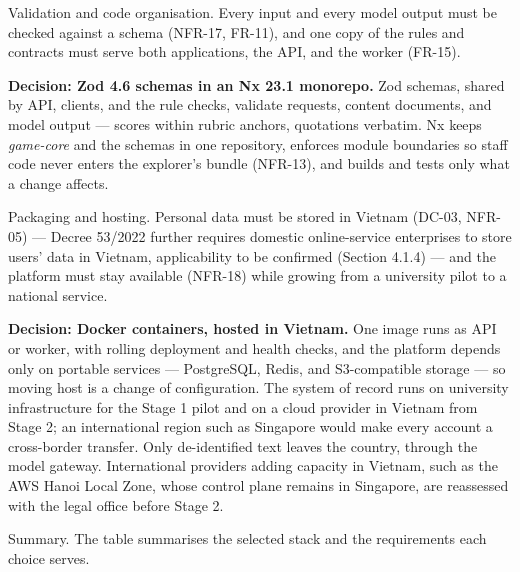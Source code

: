 Validation and code organisation. Every input and every model output must be checked against a schema (NFR-17, FR-11), and one copy of the rules and contracts must serve both applications, the API, and the worker (FR-15).

\textbf{Decision: Zod 4.6 schemas in an Nx 23.1 monorepo.} Zod schemas, shared by API, clients, and the rule checks, validate requests, content documents, and model output --- scores within rubric anchors, quotations verbatim. Nx keeps \textit{game-core} and the schemas in one repository, enforces module boundaries so staff code never enters the explorer's bundle (NFR-13), and builds and tests only what a change affects\cite{r160}.

Packaging and hosting. Personal data must be stored in Vietnam (DC-03, NFR-05) --- Decree 53/2022 further requires domestic online-service enterprises to store users' data in Vietnam, applicability to be confirmed (Section 4.1.4)\cite{r161,r162} --- and the platform must stay available (NFR-18) while growing from a university pilot to a national service.

\textbf{Decision: Docker containers, hosted in Vietnam.} One image runs as API or worker, with rolling deployment and health checks, and the platform depends only on portable services --- PostgreSQL, Redis, and S3-compatible storage --- so moving host is a change of configuration. The system of record runs on university infrastructure for the Stage 1 pilot and on a cloud provider in Vietnam from Stage 2\cite{r163}; an international region such as Singapore would make every account a cross-border transfer\cite{r99}. Only de-identified text leaves the country, through the model gateway. International providers adding capacity in Vietnam, such as the AWS Hanoi Local Zone, whose control plane remains in Singapore\cite{r164}, are reassessed with the legal office before Stage 2.

Summary. The table summarises the selected stack and the requirements each choice serves.

